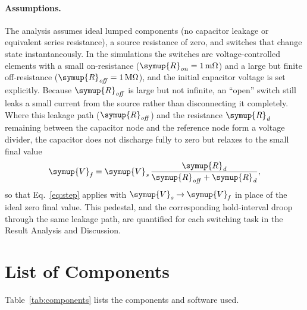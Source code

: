 \documentclass[12pt,a4paper]{article}
\begin{document}
	\paragraph{Assumptions.}
	The analysis assumes ideal lumped components (no capacitor leakage or
	equivalent series resistance), a source resistance of zero, and
	switches that change state instantaneously.  In the simulations the
	switches are voltage-controlled elements with a small on-resistance
	($\symup{R}_{\mathit{on}} = \SI{1}{\milli\ohm}$) and a large but finite
	off-resistance ($\symup{R}_{\mathit{off}} = \SI{1}{\mega\ohm}$), and the initial
	capacitor voltage is set explicitly.  Because $\symup{R}_{\mathit{off}}$ is
	large but not infinite, an ``open'' switch still leaks a small
	current from the source rather than disconnecting it completely.
	Where this leakage path ($\symup{R}_{\mathit{off}}$) and the resistance
	$\symup{R}_{\mathit{d}}$ remaining between the capacitor node and the reference
	node form a voltage divider, the capacitor does not discharge fully
	to zero but relaxes to the small final value
	\begin{equation}
		\symup{V}_{\mathit{f}} = \symup{V}_{\mathit{s}}\,\frac{\symup{R}_{\mathit{d}}}{\symup{R}_{\mathit{off}} + \symup{R}_{\mathit{d}}},
		\label{eq:pedestal}
	\end{equation}
	so that Eq.~\eqref{eq:step} applies with $\symup{V}_{\mathit{s}} \to \symup{V}_{\mathit{f}}$ in
	place of the ideal zero final value.  This pedestal, and the
	corresponding hold-interval droop through the same leakage path, are
	quantified for each switching task in the Result Analysis and
	Discussion.
	
	\newpage
	
	\section{List of Components}
	Table~\ref{tab:components} lists the components and software used.
	
\end{document}
